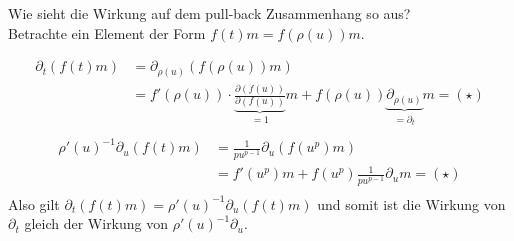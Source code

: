 \begin{bem}%
Wie sieht die Wirkung auf dem pull-back Zusammenhang so aus?\\
Betrachte ein Element der Form $f(t)m=f(\rho(u))m$.
\begin{comment}
TODO: Umformulieren als Vermutung, oder ähnliches
\end{comment}
\begin{align*}
\partial_t(f(t)m) &= \partial_{\rho(u)}(f(\rho(u))m) \\
                  &= f'(\rho(u))\cdot \underset{=1}
                    {\underbrace{\frac{\partial(f(u))}{\partial(f(u))}}}m +
                    f(\rho(u))\underset{=\partial_t}
                    {\underbrace{\partial_{\rho(u)}}}m = (\star)\\
\end{align*}
\begin{align*}
\rho'(u)^{-1}\partial_u(f(t)m) &= \frac{1}{pu^{p-1}}\partial_u(f(u^p)m) \\
                               &= f'(u^p)m+f(u^p)\frac{1}{pu^{p-1}}\partial_u m
                                 = (\star) \\
\end{align*}
Also gilt $\partial_t(f(t)m) = \rho'(u)^{-1}\partial_u(f(t)m)$ und somit ist
die Wirkung von $\partial_t$ gleich der Wirkung von $\rho'(u)^{-1}\partial_u$.
\end{bem}
%
